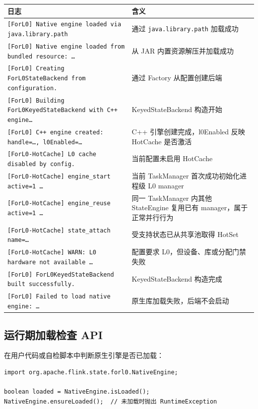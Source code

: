 \documentclass[a4paper,11pt]{article}
\begin{document}
\begin{table}[H]
\centering
\small
\begin{tabularx}{\textwidth}{L{7.4cm} X}
\toprule
\textbf{日志} & \textbf{含义} \\
\midrule
\texttt{[ForL0] Native engine loaded via java.library.path} & 通过 \texttt{java.library.path} 加载成功 \\
\texttt{[ForL0] Native engine loaded from bundled resource: \ldots} & 从 JAR 内置资源解压并加载成功 \\
\texttt{[ForL0] Creating ForL0StateBackend from configuration.} & 通过 Factory 从配置创建后端 \\
\texttt{[ForL0] Building ForL0KeyedStateBackend with C++ engine\ldots} & KeyedStateBackend 构造开始 \\
\texttt{[ForL0] C++ engine created: handle=\ldots, l0Enabled=\ldots} & C++ 引擎创建完成，l0Enabled 反映 HotCache 是否激活 \\
\texttt{[ForL0-HotCache] L0 cache disabled by config.} & 当前配置未启用 HotCache \\
\texttt{[ForL0-HotCache] engine\_start active=1 \ldots} & 当前 TaskManager 首次成功初始化进程级 L0 manager \\
\texttt{[ForL0-HotCache] engine\_reuse active=1 \ldots} & 同一 TaskManager 内其他 StateEngine 复用已有 manager，属于正常并行行为 \\
\texttt{[ForL0-HotCache] state\_attach name=\ldots} & 受支持状态已从共享池取得 HotSet \\
\texttt{[ForL0-HotCache] WARN: L0 hardware not available \ldots} & 配置要求 L0，但设备、库或分配门禁失败 \\
\texttt{[ForL0] ForL0KeyedStateBackend built successfully.} & KeyedStateBackend 构造完成 \\
\texttt{[ForL0] Failed to load native engine: \ldots} & 原生库加载失败，后端不会启动 \\
\bottomrule
\end{tabularx}
\end{table}

\subsection{运行期加载检查 API}

在用户代码或自检脚本中判断原生引擎是否已加载：

\begin{lstlisting}[language=javalang]
import org.apache.flink.state.forl0.NativeEngine;

boolean loaded = NativeEngine.isLoaded();
NativeEngine.ensureLoaded();  // 未加载时抛出 RuntimeException
\end{lstlisting}
\end{document}

